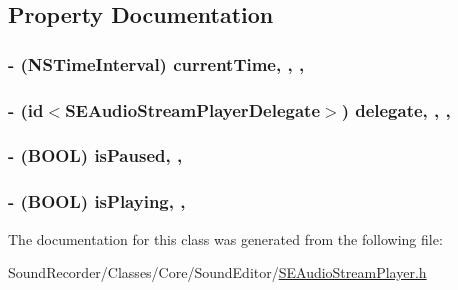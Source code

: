 \subsection{Property Documentation}
\hypertarget{interface_s_e_audio_stream_player_a079874e98c33b3fc543f9ca6ea2a59e7}{
\subsubsection[{current\-Time}]{\setlength{\rightskip}{0pt plus 5cm}-\/ (N\-S\-Time\-Interval) current\-Time\hspace{0.3cm}{\ttfamily [read]}, {\ttfamily [write]}, {\ttfamily [nonatomic]}, {\ttfamily [assign]}}}\label{interface_s_e_audio_stream_player_a079874e98c33b3fc543f9ca6ea2a59e7}
\hypertarget{interface_s_e_audio_stream_player_a423b5909f11bd592bbef74ac92b18a30}{
\subsubsection[{delegate}]{\setlength{\rightskip}{0pt plus 5cm}-\/ (id$<${\bf S\-E\-Audio\-Stream\-Player\-Delegate}$>$) delegate\hspace{0.3cm}{\ttfamily [read]}, {\ttfamily [write]}, {\ttfamily [nonatomic]}, {\ttfamily [weak]}}}\label{interface_s_e_audio_stream_player_a423b5909f11bd592bbef74ac92b18a30}
\hypertarget{interface_s_e_audio_stream_player_ad6bec3654ff73d3fd4d11111a1f69442}{
\subsubsection[{is\-Paused}]{\setlength{\rightskip}{0pt plus 5cm}-\/ (B\-O\-O\-L) is\-Paused\hspace{0.3cm}{\ttfamily [read]}, {\ttfamily [nonatomic]}, {\ttfamily [assign]}}}\label{interface_s_e_audio_stream_player_ad6bec3654ff73d3fd4d11111a1f69442}
\hypertarget{interface_s_e_audio_stream_player_ae9c780174af7f5d4bbd970049f7d1bb5}{
\subsubsection[{is\-Playing}]{\setlength{\rightskip}{0pt plus 5cm}-\/ (B\-O\-O\-L) is\-Playing\hspace{0.3cm}{\ttfamily [read]}, {\ttfamily [nonatomic]}, {\ttfamily [assign]}}}\label{interface_s_e_audio_stream_player_ae9c780174af7f5d4bbd970049f7d1bb5}


The documentation for this class was generated from the following file\-:\begin{DoxyCompactItemize}
\item 
Sound\-Recorder/\-Classes/\-Core/\-Sound\-Editor/\hyperlink{_s_e_audio_stream_player_8h}{S\-E\-Audio\-Stream\-Player.\-h}\end{DoxyCompactItemize}
